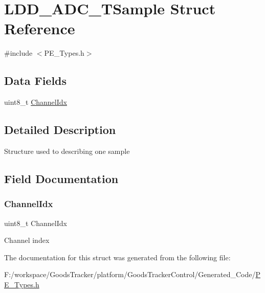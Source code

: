 \hypertarget{struct_l_d_d___a_d_c___t_sample}{}\section{L\+D\+D\+\_\+\+A\+D\+C\+\_\+\+T\+Sample Struct Reference}
\label{struct_l_d_d___a_d_c___t_sample}


{\ttfamily \#include $<$P\+E\+\_\+\+Types.\+h$>$}

\subsection*{Data Fields}
\begin{DoxyCompactItemize}
\item 
uint8\+\_\+t \hyperlink{struct_l_d_d___a_d_c___t_sample_a917afb0cff3db90f24be264e596c58f8}{Channel\+Idx}
\end{DoxyCompactItemize}


\subsection{Detailed Description}
Structure used to describing one sample 

\subsection{Field Documentation}
\mbox{\label{struct_l_d_d___a_d_c___t_sample_a917afb0cff3db90f24be264e596c58f8}} 
\subsubsection{\texorpdfstring{Channel\+Idx}{ChannelIdx}}
{\footnotesize\ttfamily uint8\+\_\+t Channel\+Idx}

Channel index 

The documentation for this struct was generated from the following file\+:\begin{DoxyCompactItemize}
\item 
F\+:/workspace/\+Goods\+Tracker/platform/\+Goods\+Tracker\+Control/\+Generated\+\_\+\+Code/\hyperlink{_p_e___types_8h}{P\+E\+\_\+\+Types.\+h}\end{DoxyCompactItemize}
